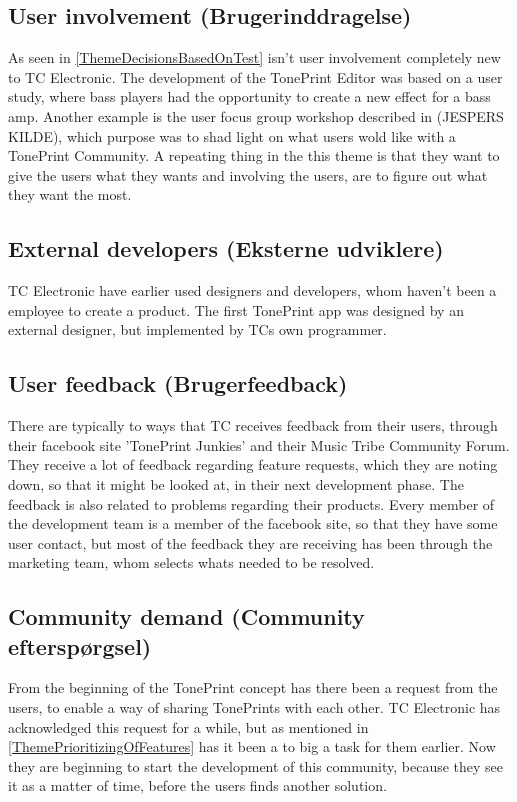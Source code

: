 \subsection*{User involvement (Brugerinddragelse)} 
\label{ThemeUserInvolvement}
As seen in \autoref{ThemeDecisionsBasedOnTest} isn't user involvement completely new to TC Electronic. The development of the TonePrint Editor was based on a user study, where bass players had the opportunity to create a new effect for a bass amp. Another example is the user focus group workshop described in (JESPERS KILDE), which purpose was to shad light on what users wold like with a TonePrint Community. A repeating thing in the this theme is that they want to give the users what they wants and involving the users, are to figure out what they want the most.


\subsection*{External developers (Eksterne udviklere)} 
\label{ThemeExternalDevelopers}
TC Electronic have earlier used designers and developers, whom haven't been a employee to create a product. The first TonePrint app was designed by an external designer, but implemented by TCs own programmer. 

\subsection*{User feedback (Brugerfeedback)} 
\label{ThemeUserFeedback}
There are typically to ways that TC receives feedback from their users, through their facebook site 'TonePrint Junkies' and their Music Tribe Community Forum. They receive a lot of feedback regarding feature requests, which they are noting down, so that it might be looked at, in their next development phase. The feedback is also related to problems regarding their products. Every member of the development team is a member of the facebook site, so that they have some user contact, but most of the feedback they are receiving has been through the marketing team, whom selects whats needed to be resolved.

\subsection*{Community demand (Community efterspørgsel)} 
\label{ThemeCommunityDemand}
From the beginning of the TonePrint concept has there been a request from the users, to enable a way of sharing TonePrints with each other. TC Electronic has acknowledged this request for a while, but as mentioned in \autoref{ThemePrioritizingOfFeatures} has it been a to big a task for them earlier. Now they are beginning to start the development of this community, because they see it as a matter of time, before the users finds another solution.

